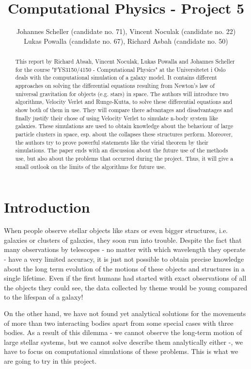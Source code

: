 \documentclass[10pt,a4paper]{article}
\author{Johannes Scheller (candidate no. 71), Vincent Noculak (candidate no. 22)\\ Lukas Powalla (candidate no. 67), Richard Asbah (candidate no. 50) }
\title{Computational Physics - Project 5}
\begin{document}
\maketitle
\newpage
\tableofcontents
\newpage

\begin{abstract}
This report by Richard Absah, Vincent Noculak, Lukas Powalla and Johannes Scheller for the course "FYS3150/4150 - Computational Physics" at the Universitetet i Oslo deals with the computational simulation of a galaxy model. It contains different approaches on solving the differential equations resulting from Newton's law of universal gravitation for objects (e.g. stars) in space. The authors will introduce two algorithms, Velocity Verlet and Runge-Kutta, to solve these differential equations and show both of them in use. They will compare there advantages and disadvantages and finally justify their chose of using Velocity Verlet to simulate n-body system like galaxies. These simulations are used to obtain knowledge about the behaviour of large particle clusters in space, esp. about the collapses these structures perform. Moreover, the authors try to prove powerful statements like the virial theorem by their simulations. The paper ends with an discussion about the future use of the methods use, but also about the problems that occurred during the project. Thus, it will give a small outlook on the limits of the algorithms for future use.
\end{abstract}
\section{Introduction}

When people observe stellar objects like stars or even bigger structures, i.e. galaxies or clusters of galaxies, they soon run into trouble. Despite the fact that many observations by telescopes - no matter with which wavelength they operate - have a very limited accuracy, it is just not possible to obtain precise knowledge about the long term evolution of the motions of these objects and structures in a single lifetime. Even if the first humans had started with exact observations of all the objects they could see, the data collected by theme would be young compared to the lifespan of a galaxy!

On the other hand, we have not found yet analytical solutions for the movements of more than two interacting bodies apart from some special cases with three bodies. As a result of this dilemma - we cannot observe the long-term motion of large stellar systems, but we cannot solve describe them analytically either -, we have to focus on computational simulations of these problems. This is what we are going to try in this project.
\end{document}

